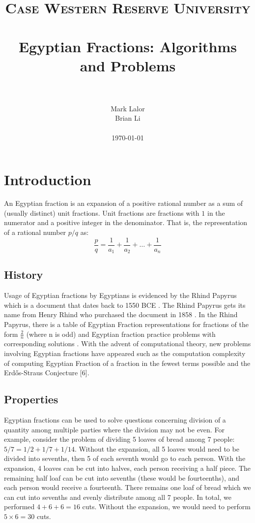 \documentclass[paper=a4, fontsize=11pt]{scrartcl}
\title{
		\usefont{OT1}{bch}{b}{n}
		\normalfont \normalsize \textsc{Case Western Reserve University} \\ [25pt]
		\horrule{0.5pt} \\[0.4cm]
		\huge Egyptian Fractions: Algorithms and Problems \\
		\horrule{2pt} \\[0.5cm]
}
\author{
		\normalfont 			\normalsize
        Mark Lalor\\[-3pt]		\normalsize
        Brian Li\\[-3pt]		\normalsize
        \\
        \today
}
\date{}
\numberwithin{equation}{section}	 %
\numberwithin{figure}{section}	 %
\numberwithin{table}{section}	 %
\begin{document}
\maketitle
\section{Introduction}
An Egyptian fraction is an expansion of a positive rational number as a sum of (usually distinct) unit fractions. Unit fractions are fractions with $1$ in the numerator and a positive integer in the denominator. That is, the representation of a rational number $p/q$ as:
\begin{equation}
	\frac{p}{q} = \frac{1}{a_1} + \frac{1}{a_2} + \ldots + \frac{1}{a_n}
\end{equation}
\subsection{History}
Usage of Egyptian fractions by Egyptians is evidenced by the Rhind Papyrus which is a document that dates back to 1550 BCE \cite{imhausen}. The Rhind Papyrus gets its name from Henry Rhind who purchased the document in 1858 \cite{imhausen}. In the Rhind Papyrus, there is a table of Egyptian Fraction representations for fractions of the form $\frac{2}{n}$ (where n is odd) and Egyptian fraction practice problems with corresponding solutions \cite{imhausen}. With the advent of computational theory, new problems involving Egyptian fractions have appeared such as the computation complexity of computing Egyptian Fraction of a fraction in the fewest terms possible and the Erd\H{o}s-Straus Conjecture [6].
\subsection{Properties}
Egyptian fractions can be used to solve questions concerning division of a quantity among multiple parties where the division may not be even. For example, consider the problem of dividing 5 loaves of bread among 7 people: $5/7 = 1/2 + 1/7 + 1/14$. Without the expansion, all 5 loaves would need to be divided into sevenths, then 5 of each seventh would go to each person. With the expansion, 4 loaves can be cut into halves, each person receiving a half piece. The remaining half loaf can be cut into sevenths (these would be fourteenths), and each person would receive a fourteenth. There remains one loaf of bread which we can cut into sevenths and evenly distribute among all 7 people. In total, we performed $4 + 6 + 6 = 16$ cuts. Without the expansion, we would need to perform $5 \times 6 = 30$ cuts.
\end{document}
